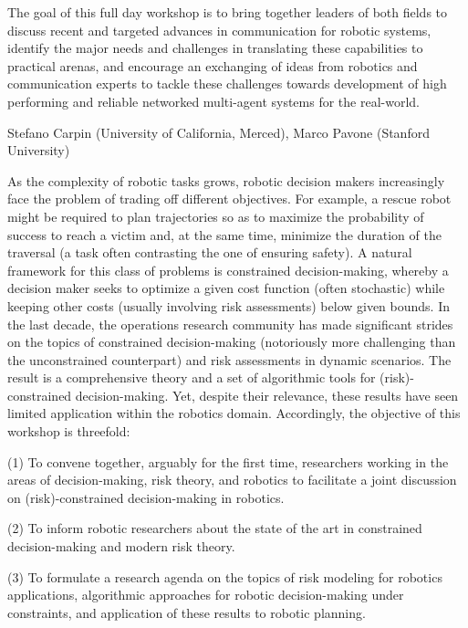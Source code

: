 \begin{spacing}{1.0}
{The goal of this full day workshop is to bring together leaders of both fields to discuss recent and targeted advances in communication for robotic systems, identify the major needs and challenges in translating these capabilities to practical arenas, and encourage an exchanging of ideas from robotics and communication experts to tackle these challenges towards development of high performing and reliable networked multi-agent systems for the real-world.
}


\clearpage
{}
{Stefano Carpin (University of California, Merced), Marco Pavone (Stanford University)}
{
As the complexity of robotic tasks grows, robotic decision makers increasingly face the problem of trading off different objectives. For example, a rescue robot might be required to plan trajectories so as to maximize the probability of success to reach a victim and, at the same time, minimize the duration of the traversal (a task often contrasting the one of ensuring safety). A natural framework for this class of problems is constrained decision-making, whereby a decision maker seeks to optimize a given cost function (often stochastic) while keeping other costs (usually involving risk assessments) below given bounds. In the last decade, the operations research community has made significant strides on the topics of constrained decision-making (notoriously more challenging than the unconstrained counterpart) and risk assessments in dynamic scenarios. The result is a comprehensive theory and a set of algorithmic tools for (risk)-constrained decision-making. Yet, despite their relevance, these results have seen limited application within the robotics domain. Accordingly, the objective of this workshop is threefold: 

(1) To convene together, arguably for the first time, researchers working in the areas of decision-making, risk theory, and robotics to facilitate a joint discussion on (risk)-constrained decision-making in robotics.  

(2) To inform robotic researchers about the state of the art in constrained decision-making and modern risk theory.

(3) To formulate a research agenda on the topics of risk modeling for robotics applications, algorithmic approaches for robotic decision-making under constraints, and application of these results to robotic planning.
}




\end{spacing}
